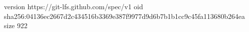 version https://git-lfs.github.com/spec/v1
oid sha256:04136ec2667d2c434516b3369e387f9977d9d6b7b1b1cc9c45fa113680b264ea
size 922
